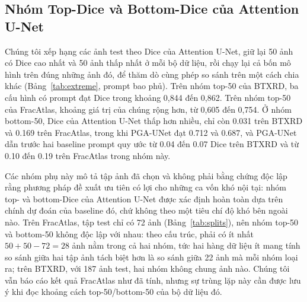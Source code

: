 \documentclass[11pt]{article}
\begin{document}
\subsection{Nhóm Top-Dice và Bottom-Dice của Attention U-Net}
\label{sec:extreme}
Chúng tôi xếp hạng các ảnh test theo Dice của Attention U-Net, giữ lại 50 ảnh có Dice cao nhất và 50 ảnh thấp nhất ở mỗi bộ dữ liệu, rồi chạy lại cả bốn mô hình trên đúng những ảnh đó, để thăm dò cùng phép so sánh trên một cách chia khác (Bảng~\ref{tab:extreme}, prompt bao phủ). Trên nhóm top-50 của BTXRD, ba cấu hình có prompt đạt Dice trong khoảng 0,844 đến 0,862. Trên nhóm top-50 của FracAtlas, khoảng giá trị của chúng rộng hơn, từ 0,605 đến 0,754. Ở nhóm bottom-50, Dice của Attention U-Net thấp hơn nhiều, chỉ còn 0.031 trên BTXRD và 0.169 trên FracAtlas, trong khi PGA-UNet đạt 0.712 và 0.687, và PGA-UNet dẫn trước hai baseline prompt quy ước từ 0.04 đến 0.07 Dice trên BTXRD và từ 0.10 đến 0.19 trên FracAtlas trong nhóm này.

Các nhóm phụ này mô tả tập ảnh đã chọn và không phải bằng chứng độc lập rằng phương pháp đề xuất ưu tiên có lợi cho những ca vốn khó nội tại: nhóm top- và bottom-Dice của Attention U-Net được xác định hoàn toàn dựa trên chính dự đoán của baseline đó, chứ không theo một tiêu chí độ khó bên ngoài nào. Trên FracAtlas, tập test chỉ có 72 ảnh (Bảng~\ref{tab:splits}), nên nhóm top-50 và bottom-50 không độc lập với nhau: theo cấu trúc, phải có ít nhất $50+50-72=28$ ảnh nằm trong cả hai nhóm, tức hai hàng dữ liệu ít mang tính so sánh giữa hai tập ảnh tách biệt hơn là so sánh giữa 22 ảnh mà mỗi nhóm loại ra; trên BTXRD, với 187 ảnh test, hai nhóm không chung ảnh nào. Chúng tôi vẫn báo cáo kết quả FracAtlas như đã tính, nhưng sự trùng lặp này cần được lưu ý khi đọc khoảng cách top-50/bottom-50 của bộ dữ liệu đó.
\end{document}
